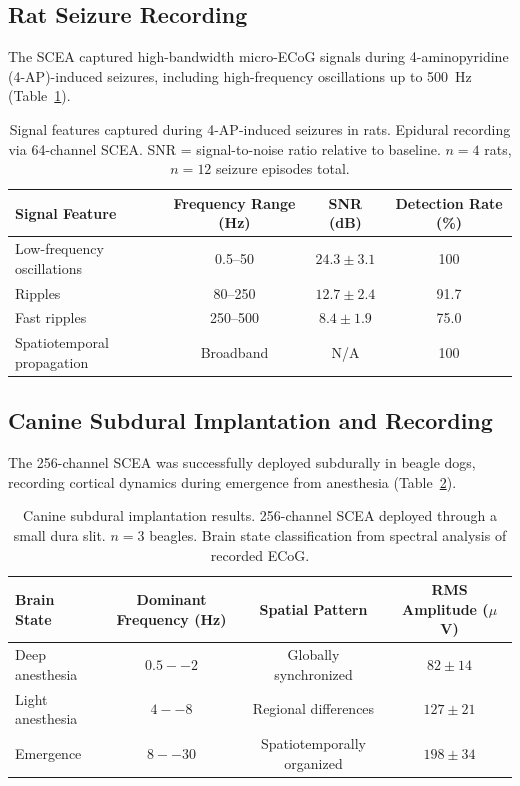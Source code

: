 \documentclass[11pt]{article}
\begin{document}
\subsection{Rat Seizure Recording}

The SCEA captured high-bandwidth micro-ECoG signals during 4-aminopyridine (4-AP)-induced seizures, including high-frequency oscillations up to 500~Hz (Table~\ref{tab:seizure}).

\begin{table}[H]
\centering
\caption{Signal features captured during 4-AP-induced seizures in rats. Epidural recording via 64-channel SCEA. SNR = signal-to-noise ratio relative to baseline. $n = 4$ rats, $n = 12$ seizure episodes total.}
\label{tab:seizure}
\begin{tabular}{lccc}
\toprule
\textbf{Signal Feature} & \textbf{Frequency Range (Hz)} & \textbf{SNR (dB)} & \textbf{Detection Rate (\%)} \\
\midrule
Low-frequency oscillations & 0.5--50 & $24.3 \pm 3.1$ & 100 \\
Ripples & 80--250 & $12.7 \pm 2.4$ & 91.7 \\
Fast ripples & 250--500 & $8.4 \pm 1.9$ & 75.0 \\
Spatiotemporal propagation & Broadband & N/A & 100 \\
\bottomrule
\end{tabular}
\end{table}

\subsection{Canine Subdural Implantation and Recording}

The 256-channel SCEA was successfully deployed subdurally in beagle dogs, recording cortical dynamics during emergence from anesthesia (Table~\ref{tab:canine}).

\begin{table}[H]
\centering
\caption{Canine subdural implantation results. 256-channel SCEA deployed through a small dura slit. $n = 3$ beagles. Brain state classification from spectral analysis of recorded ECoG.}
\label{tab:canine}
\begin{tabular}{lccc}
\toprule
\textbf{Brain State} & \textbf{Dominant Frequency (Hz)} & \textbf{Spatial Pattern} & \textbf{RMS Amplitude ($\mu$V)} \\
\midrule
Deep anesthesia & $0.5--2$ & Globally synchronized & $82 \pm 14$ \\
Light anesthesia & $4--8$ & Regional differences & $127 \pm 21$ \\
Emergence & $8--30$ & Spatiotemporally organized & $198 \pm 34$ \\
\bottomrule
\end{tabular}
\end{table}
\end{document}
